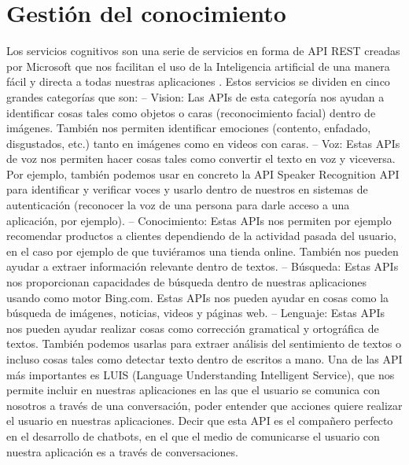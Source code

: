 \section{Gestión del conocimiento}

Los servicios cognitivos son una serie de servicios en forma de API REST creadas por Microsoft que nos facilitan el uso de la Inteligencia artificial de una manera fácil y directa a todas nuestras aplicaciones \cite{GMiravet}.
Estos servicios se dividen en cinco grandes categorías que son:
– Vision: Las APIs de esta categoría nos ayudan a identificar cosas tales como objetos o caras (reconocimiento facial) dentro de imágenes. También nos permiten identificar emociones (contento, enfadado, disgustados, etc.) tanto en imágenes como en videos con caras.
– Voz: Estas APIs de voz nos permiten hacer cosas tales como convertir el texto en voz y viceversa. Por ejemplo, también podemos usar en concreto la API Speaker Recognition API para identificar y verificar voces y usarlo dentro de nuestros en sistemas de autenticación (reconocer la voz de una persona para darle acceso a una aplicación, por ejemplo).
– Conocimiento: Estas APIs nos permiten por ejemplo recomendar productos a clientes dependiendo de la actividad pasada del usuario, en el caso por ejemplo de que tuviéramos una tienda online. También nos pueden ayudar a extraer información relevante dentro de textos.
– Búsqueda: Estas APIs nos proporcionan capacidades de búsqueda dentro de nuestras aplicaciones usando como motor Bing.com. Estas APIs nos pueden ayudar en cosas como la búsqueda de imágenes, noticias, videos y páginas web.
– Lenguaje: Estas APIs nos pueden ayudar realizar cosas como corrección gramatical y ortográfica de textos. También podemos usarlas para extraer análisis del sentimiento de textos o incluso cosas tales como detectar texto dentro de escritos a mano.
Una de las API más importantes es LUIS (Language Understanding Intelligent Service), que nos permite incluir en nuestras aplicaciones en las que el usuario se comunica con nosotros a través de una conversación, poder entender que acciones quiere realizar el usuario en nuestras aplicaciones. Decir que esta API es el compañero perfecto en el desarrollo de chatbots, en el que el medio de comunicarse el usuario con nuestra aplicación es a través de conversaciones.


